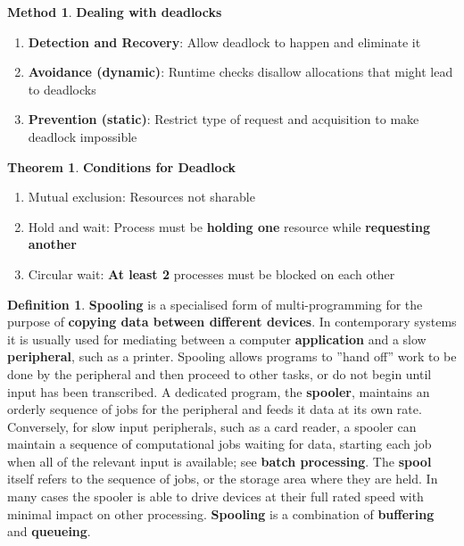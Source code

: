 \documentclass[12pt,a4paper]{article}
\theoremstyle{definition}
\newtheorem{theorem}{Theorem}[section]
\newtheorem{definition}{Definition}[section]
\newtheorem{method}{Method}[section]
\newenvironment{myenumerate}
{ \begin{enumerate}
    \setlength{\itemsep}{5pt}
    \setlength{\parskip}{0pt}
    \setlength{\parsep}{0pt}     }
{ \end{enumerate}                }
\begin{document}
\begin{method}{\textbf{Dealing with deadlocks}}
	\begin{myenumerate}
		\item \textbf{Detection and Recovery}: Allow deadlock to happen and eliminate it
		\item \textbf{Avoidance (dynamic)}: Runtime checks disallow allocations that might lead to deadlocks
		\item \textbf{Prevention (static)}: Restrict type of request and acquisition to make deadlock impossible
	\end{myenumerate}
\end{method}

\begin{theorem}{\textbf{Conditions for Deadlock}}
	\begin{myenumerate}
		\item Mutual exclusion: Resources not sharable
		\item Hold and wait: Process must be \textbf{holding one} resource while \textbf{requesting another}
		\item Circular wait: \textbf{At least 2} processes must be blocked on each other
	\end{myenumerate}
\end{theorem}

\begin{definition}{\textbf{Spooling}}
	is a specialised form of multi-programming for the purpose of \textbf{copying data between different devices}. In contemporary systems it is usually used for mediating between a computer \textbf{application} and a slow \textbf{peripheral}, such as a printer. Spooling allows programs to ''hand off'' work to be done by the peripheral and then proceed to other tasks, or do not begin until input has been transcribed. A dedicated program, the \textbf{spooler}, maintains an orderly sequence of jobs for the peripheral and feeds it data at its own rate. Conversely, for slow input peripherals, such as a card reader, a spooler can maintain a sequence of computational jobs waiting for data, starting each job when all of the relevant input is available; see \textbf{batch processing}. The \textbf{spool} itself refers to the sequence of jobs, or the storage area where they are held. In many cases the spooler is able to drive devices at their full rated speed with minimal impact on other processing. \textbf{Spooling} is a combination of \textbf{buffering} and \textbf{queueing}.
\end{definition}
\end{document}

